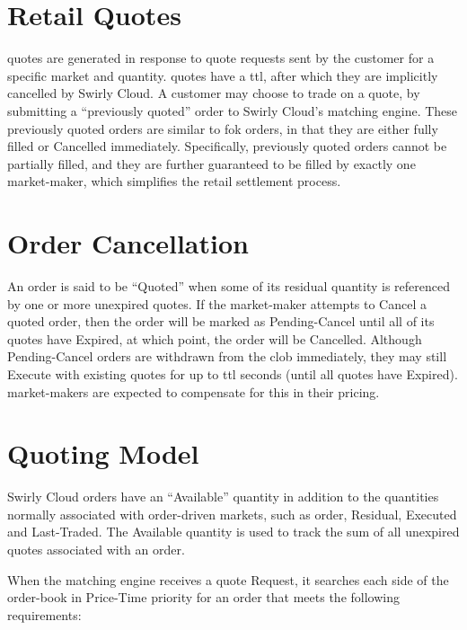 \documentclass[12pt,a4paper,notitlepage,bibliography=totoc]{scrreprt}
\newcommand{\swirly}{Swirly Cloud}
\begin{document}
\section{Retail Quotes}

\Glspl{quote} are generated in response to \gls{quote} requests sent by the customer for a specific
\gls{market} and quantity. \Glspl{quote} have a \gls{ttl}, after which they are implicitly cancelled
by \swirly{}. A customer may choose to \gls{trade} on a \gls{quote}, by submitting a ``previously
quoted'' \gls{order} to \swirly{}'s \gls{matching engine}. These previously quoted \glspl{order} are
similar to \gls{fok} \glspl{order}, in that they are either fully filled or Cancelled
immediately. Specifically, previously quoted \glspl{order} cannot be partially filled, and they are
further guaranteed to be filled by exactly one \gls{market-maker}, which simplifies the retail
settlement process.

\section{Order Cancellation}

An \gls{order} is said to be ``Quoted'' when some of its residual quantity is referenced by one or
more unexpired \glspl{quote}. If the \gls{market-maker} attempts to Cancel a quoted \gls{order},
then the \gls{order} will be marked as Pending-Cancel until all of its \glspl{quote} have Expired,
at which point, the \gls{order} will be Cancelled. Although Pending-Cancel \glspl{order} are
withdrawn from the \gls{clob} immediately, they may still Execute with existing \glspl{quote} for up
to \gls{ttl} seconds (until all \glspl{quote} have Expired). \Glspl{market-maker} are expected to
compensate for this in their pricing.

\section{Quoting Model}

\swirly{} \glspl{order} have an ``Available'' quantity in addition to the quantities normally
associated with \gls{order-driven} \glspl{market}, such as \gls{order}, Residual, Executed and
Last-Traded. The Available quantity is used to track the sum of all unexpired \glspl{quote}
associated with an \gls{order}.

When the \gls{matching engine} receives a \gls{quote} Request, it searches each side of the
\gls{order-book} in Price-Time priority for an \gls{order} that meets the following requirements:
\end{document}
